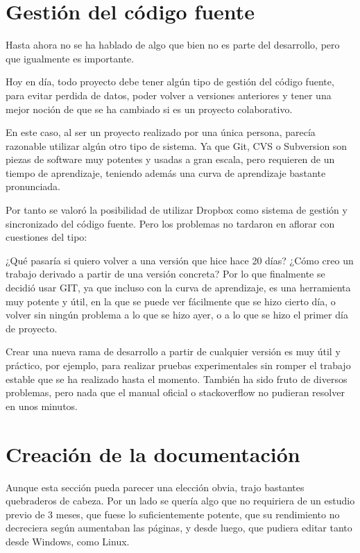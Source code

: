 \section{Gesti\'{o}n del c\'{o}digo fuente}
Hasta ahora no se ha hablado de algo que bien no es parte del desarrollo, pero que igualmente es importante.

Hoy en d\'ia, todo proyecto debe tener alg\'un tipo de gesti\'on del c\'odigo fuente, para evitar perdida de datos, 
poder volver a versiones anteriores y tener una mejor noci\'on de que se ha cambiado si es un proyecto colaborativo.

En este caso, al ser un proyecto realizado por una \'unica persona, parec\'ia razonable utilizar alg\'un otro tipo
de sistema. Ya que Git, CVS o Subversion son piezas de software muy potentes y usadas a gran escala, pero requieren
de un tiempo de aprendizaje, teniendo adem\'as una curva de aprendizaje bastante pronunciada.

Por tanto se valor\'o la posibilidad de utilizar Dropbox como sistema de gesti\'on y sincronizado del c\'odigo fuente.
Pero los problemas no tardaron en aflorar con cuestiones del tipo:

¿Qu\'e pasar\'ia si quiero volver a una versi\'on que hice hace 20 d\'ias? ¿C\'omo creo un trabajo derivado a partir
de una versi\'on concreta? Por lo que finalmente se decidi\'o usar GIT, ya que incluso con la curva de aprendizaje,
es una herramienta muy potente y \'util, en la que se puede ver f\'acilmente que se hizo cierto d\'ia, o volver sin 
ning\'un problema a lo que se hizo ayer, o a lo que se hizo el primer d\'ia de proyecto.

Crear una nueva rama de desarrollo a partir de cualquier versi\'on es muy \'util y pr\'actico, por ejemplo, para
realizar pruebas experimentales sin romper el trabajo estable que se ha realizado hasta el momento. Tambi\'en
ha sido fruto de diversos problemas, pero nada que el manual oficial o stackoverflow no pudieran
resolver en unos minutos.

\section{Creaci\'{o}n de la documentaci\'{o}n}
Aunque esta secci\'{o}n pueda parecer una elecci\'{o}n obvia, trajo bastantes quebraderos de cabeza. Por un lado
se quer\'{i}a algo que no requiriera
de un estudio previo de 3 meses, que fuese lo suficientemente potente, que su rendimiento no decreciera seg\'{u}n aumentaban las 
p\'{a}ginas, y desde luego,
que pudiera editar tanto desde Windows, como Linux.


